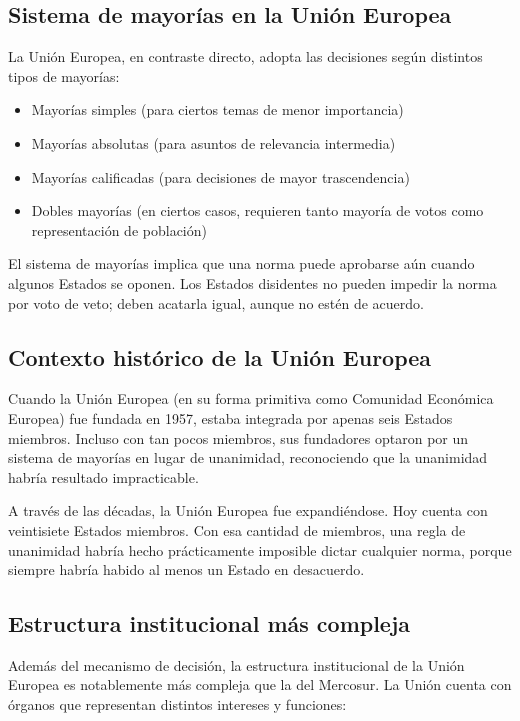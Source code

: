 \documentclass[12pt,oneside]{book}
\begin{document}
\subsection{Sistema de mayorías en la Unión Europea}

La Unión Europea, en contraste directo, adopta las decisiones según distintos tipos de mayorías:

\begin{itemize}
\item Mayorías simples (para ciertos temas de menor importancia)
\item Mayorías absolutas (para asuntos de relevancia intermedia)
\item Mayorías calificadas (para decisiones de mayor trascendencia)
\item Dobles mayorías (en ciertos casos, requieren tanto mayoría de votos como representación de población)
\end{itemize}

El sistema de mayorías implica que una norma puede aprobarse aún cuando algunos Estados se oponen. Los Estados disidentes no pueden impedir la norma por voto de veto; deben acatarla igual, aunque no estén de acuerdo.

\subsection{Contexto histórico de la Unión Europea}

Cuando la Unión Europea (en su forma primitiva como Comunidad Económica Europea) fue fundada en 1957, estaba integrada por apenas seis Estados miembros. Incluso con tan pocos miembros, sus fundadores optaron por un sistema de mayorías en lugar de unanimidad, reconociendo que la unanimidad habría resultado impracticable.

A través de las décadas, la Unión Europea fue expandiéndose. Hoy cuenta con veintisiete Estados miembros. Con esa cantidad de miembros, una regla de unanimidad habría hecho prácticamente imposible dictar cualquier norma, porque siempre habría habido al menos un Estado en desacuerdo.

\subsection{Estructura institucional más compleja}

Además del mecanismo de decisión, la estructura institucional de la Unión Europea es notablemente más compleja que la del Mercosur. La Unión cuenta con órganos que representan distintos intereses y funciones:
\end{document}
